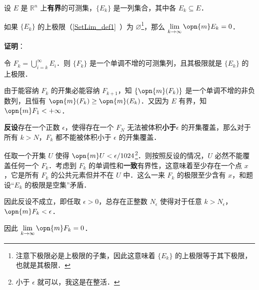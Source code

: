 



\begin{lemma}{}\label{EgrfTh_lem1}
设 $E$ 是 $\mathbb{R}^n$ 上\textbf{有界}的可测集，$\{E_k\}$ 是一列集合，其中各 $E_k\subseteq E$．

如果 $\{E_k\}$ 的上极限（\autoref{SetLim_def1}~）为 $\varnothing$\footnote{注意下极限必是上极限的子集，因此这意味着 $\{E_k\}$ 的上极限等于其下极限，也就是其极限．}，那么 $\lim\limits_{k\to\infty}\opn{m}E_k=0$．
\end{lemma}

\textbf{证明}：

令 $F_k=\bigcup_{i=k}^\infty E_i$．则 $\{F_k\}$ 是一个单调不增的可测集列，且其极限就是 $\{E_k\}$ 的上极限．

由于能容纳 $F_k$ 的开集必能容纳 $F_{k+1}$，知 $\{\opn{m}(F_k)\}$ 是一个单调不增的非负数列，且恒有 $\opn{m}(F_k)\geq\opn{m}(E_k)$．又因为 $E$ 有界，知 $\opn{m}F_1<+\infty$．

\textbf{反设}存在一个正数 $\epsilon$，使得存在一个 $F_N$ 无法被体积\textbf{小于}$\epsilon$ 的开集覆盖，那么对于所有 $k>N$，$F_k$ 都不能被体积小于 $\epsilon$ 的开集覆盖．

任取一个开集 $U$ 使得 $\opn{m}U<\epsilon/1024$\footnote{小于 $\epsilon$ 就可以，我这是在整活．}．则按照反设的情况，$U$ 必然不能覆盖任何一个 $F_k$．考虑到 $F_k$ 的单调性和\textbf{一致}有界性，这意味着至少存在一个点 $x$，它是所有 $F_k$ 的公共元素但并不在 $U$ 中．这么一来 $F_k$ 的极限至少含有 $x$，和题设“$E_k$ 的极限是空集”矛盾．

因此反设不成立，即任取 $\epsilon>0$，总存在正整数 $N_\epsilon$ 使得对于任意 $k>N_\epsilon$，$\opn{m}F_k<\epsilon$．

因此 $\lim\limits_{k\to\infty}\opn{m}F_k=0$．

